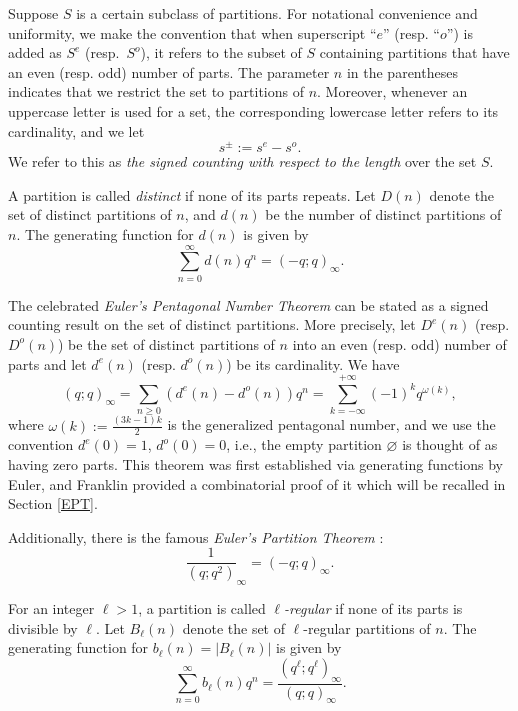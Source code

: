 \documentclass[12pt,reqno]{amsart}
\numberwithin{equation}{section}
\begin{document}
	Suppose $S$ is a certain subclass of partitions. For notational convenience and uniformity, we make the convention that when superscript ``$e$'' (resp. ``$o$'') is added as $S^{e}$ (resp.~$S^{o}$), it refers to the subset of $S$ containing partitions that have an even (resp. odd) number of parts. The parameter $n$ in the parentheses indicates that we restrict the set to partitions of $n$. Moreover, whenever an uppercase letter is used for a set, the corresponding lowercase letter refers to its cardinality, and we let
	$$s^{\pm}:=s^{e}-s^{o}.$$
	We refer to this as \emph{the signed counting with respect to the length} over the set $S$.
	
	A partition is called \textit{distinct} if none of its parts repeats. Let $D(n)$ denote the set of distinct partitions of $n$, and $d(n)$ be the number of distinct partitions of $n$. The generating function for $d(n)$ is given by
	\begin{equation}
		\sum_{n=0}^{\infty} d(n)q^n=(-q;q)_{\infty}.
	\end{equation}
	
	The celebrated \textit{Euler's Pentagonal Number Theorem} \cite[Theorem 1.6]{andrews1998} can be stated as a signed counting result on the set of distinct partitions. More precisely, let $D^e(n)$ (resp. $D^o(n)$) be the set of distinct partitions of $n$ into an even (resp. odd) number of parts and let $d^e(n)$ (resp. $d^o(n)$) be its cardinality.
	We have
	\begin{equation}\label{eq:PNT}
		(q;q)_{\infty}=\sum_{n\geq0}(d^e(n)-d^o(n))q^n=\sum_{k=-\infty}^{+\infty}(-1)^{k}q^{\omega(k)},
	\end{equation}
	where $\omega(k):=\frac{(3k-1)k}{2}$ is the generalized pentagonal number, and we use the convention $d^e(0)=1$, $d^o(0)=0$, i.e., the empty partition $\varnothing$ is thought of as having zero parts. This theorem was first established via generating functions by Euler, and Franklin \cite[Theorem~1.6]{andrews1998} provided a combinatorial proof of it which will be recalled in Section \ref{EPT}.
	
	Additionally, there is the famous \textit{Euler's Partition Theorem} \cite[Corollary 1.2]{andrews1998}:
	\begin{equation}
		\frac{1}{(q;q^2)}_{\infty}=(-q;q)_{\infty}.
		\label{Euler}
	\end{equation}
	
	For an integer $\ell > 1$, a partition is called \textit{$\ell$-regular} if none of its parts is divisible by $\ell$. Let $B_{\ell}(n)$ denote the set of $\ell$-regular partitions of $n$. The generating function for $b_{\ell}(n)=|B_{\ell}(n)|$ is given by~\cite[Corollary 1.3]{andrews1998}
	\begin{equation}\label{gf:l-reg}
		\sum_{n=0}^{\infty} b_{\ell}(n)q^n=\frac{(q^{\ell};q^{\ell})_\infty}{(q;q)_\infty}.
	\end{equation}
	
\end{document}
